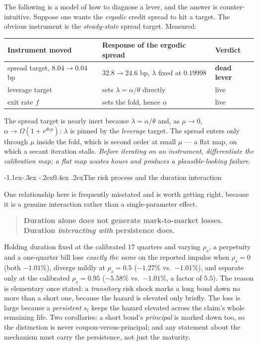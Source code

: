 \documentclass[10pt,a4paper]{article}
\makeatletter
\theoremstyle{definition}
\theoremstyle{plain}
\theoremstyle{remark}
\renewcommand\subsection{\@startsection{subsection}{2}{\z@}%
  {-1.1ex\@plus -.3ex \@minus -.2ex}{0.4ex \@plus .2ex}{\normalfont\normalsize\bfseries}}
\makeatother
\begin{document}
The following is a model of how to diagnose a lever, and the answer is counter-intuitive.
Suppose one wants the \emph{ergodic} credit spread to hit a target. The obvious instrument is
the \emph{steady-state} spread target. Measured:
\begin{center}\small
\begin{tabular}{@{}lll@{}}
\toprule
Instrument moved & Response of the ergodic spread & Verdict \\
\midrule
spread target, $8.04 \to 0.04$ bp & $32.8 \to 24.6$ bp, $\lambda$ fixed at $0.19998$ & \textbf{dead lever} \\
leverage target & sets $\lambda = \alpha/\theta$ directly & live \\
exit rate $f$ & sets the fold, hence $\alpha$ & live \\
\bottomrule
\end{tabular}
\end{center}
The spread target is nearly inert because $\lambda = \alpha/\theta$ and, as $\mu\to0$,
$\alpha\to\Omega(1+r^{dep})$: $\lambda$ is pinned by the \emph{leverage} target. The spread
enters only through $\mu$ inside the fold, which is second order at small $\mu$ --- a flat
map, on which a secant iteration stalls. \emph{Before iterating on an instrument, differentiate
the calibration map; a flat map wastes hours and produces a plausible-looking failure.}

\subsection{The risk process and the duration interaction}

One relationship here is frequently misstated and is worth getting right, because it is a
genuine interaction rather than a single-parameter effect.

\begin{quote}
\textbf{Duration alone does not generate mark-to-market losses. Duration \emph{interacting
with} persistence does.}
\end{quote}
Holding duration fixed at the calibrated $17$ quarters and varying $\rho_s$, a perpetuity and a
one-quarter bill lose \emph{exactly the same} on the reported impulse when $\rho_s = 0$ (both
$-1.01\%$), diverge mildly at $\rho_s = 0.5$ ($-1.27\%$ vs.\ $-1.01\%$), and separate only at
the calibrated $\rho_s = 0.95$ ($-5.58\%$ vs.\ $-1.01\%$, a factor of $5.5$). The reason is
elementary once stated: a \emph{transitory} risk shock marks a long bond down no more than a
short one, because the hazard is elevated only briefly. The loss is large because a
\emph{persistent} $s_t$ keeps the hazard elevated across the claim's whole remaining life.
Two corollaries: a short bond's \emph{principal} is marked down too, so the distinction is
never coupon-versus-principal; and any statement about the mechanism must carry the
persistence, not just the maturity.
\end{document}
